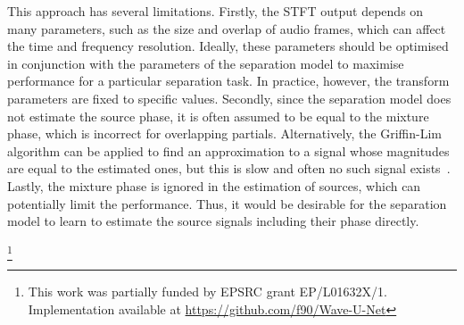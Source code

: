\documentclass{article}
\newcommand\blfootnote[1]{\begingroup
  \renewcommand\thefootnote{}\footnote{#1}\addtocounter{footnote}{-1}\endgroup
}
\begin{document}
This approach has several limitations.
Firstly, the STFT output depends on many parameters, such as the size and overlap of audio frames, which can affect the time and frequency resolution.
Ideally, these parameters should be optimised in conjunction with the parameters of the separation model to maximise performance for a particular separation task.
In practice, however, the transform parameters are fixed to specific values.
Secondly, since the separation model does not estimate the source phase, it is often assumed to be equal to the mixture phase, which is incorrect for overlapping partials.
Alternatively, the Griffin-Lim algorithm can be applied to find an approximation to a signal whose magnitudes are equal to the estimated ones, but this is slow and often no such signal exists~\cite{LeRoux2008}.
Lastly, the mixture phase is ignored in the estimation of sources, which can potentially limit the performance.
Thus, it would be desirable for the separation model to learn to estimate the source signals including their phase directly.

\blfootnote{This work was partially funded by EPSRC grant EP/L01632X/1. Implementation available at \url{https://github.com/f90/Wave-U-Net}}
\end{document}
